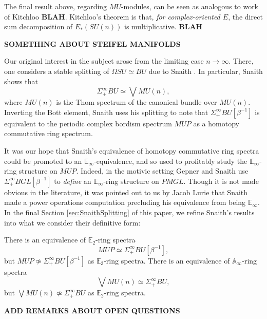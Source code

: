 The final result above, regarding $MU$-modules, can be seen as analogous to work of Kitchloo \textbf{BLAH}.  Kitchloo's theorem is that, \textit{for complex-oriented $E$}, the direct sum decomposition of $E_*(SU(n))$ is multiplicative.  \textbf{BLAH}

\textbf{SOMETHING ABOUT STEIFEL MANIFOLDS}

Our original interest in the subject arose from the limiting case $n \rightarrow \infty$.  There, one considers a stable splitting of $\Omega SU \simeq BU$ due to Snaith \cite{SnaithBook}.  In particular, Snaith shows that
$$\Sigma^{\infty}_+ BU \simeq \bigvee MU(n),$$
where $MU(n)$ is the Thom spectrum of the canonical bundle over $MU(n)$.  Inverting the Bott element, Snaith uses his splitting to note that $\Sigma^{\infty}_+ BU [\beta^{-1}]$ is equivalent to the periodic complex bordism spectrum $MUP$ as a homotopy commutative ring spectrum.

It was our hope that Snaith's equivalence of homotopy commutative ring spectra could be promoted to an $\mathbb{E}_\infty$-equivalence, and so used to profitably study the $\mathbb{E}_\infty$-ring structure on $MUP$.  Indeed, in the motivic setting Gepner and Snaith \cite{GepnerSnaith} use $\Sigma^{\infty}_+ BGL[\beta^{-1}]$ to \textit{define} an $\mathbb{E}_\infty$-ring structure on $PMGL$.  Though it is not made obvious in the literature, it was pointed out to us by Jacob Lurie that Snaith \cite{SnaithNotMultiplicative} made a power operations computation precluding his equivalence from being $\mathbb{E}_\infty$.  In the final Section \ref{sec:SnaithSplitting} of this paper, we refine Snaith's results into what we consider their definitive form:

\begin{thm}
There is an equivalence of $\mathbb{E}_2$-ring spectra
$$MUP \simeq \Sigma^{\infty}_+ BU[\beta^{-1}],$$
but $MUP \not \simeq \Sigma^{\infty}_+ BU[\beta^{-1}]$ as $\mathbb{E}_3$-ring spectra.  There is an equivalence of $\mathbb{A}_\infty$-ring spectra
$$\bigvee MU(n) \simeq \Sigma^{\infty}_+ BU,$$
but $\bigvee MU(n) \not \simeq \Sigma^{\infty}_+ BU$ as $\mathbb{E}_2$-ring spectra.
\end{thm}


\textbf{ADD REMARKS ABOUT OPEN QUESTIONS}

